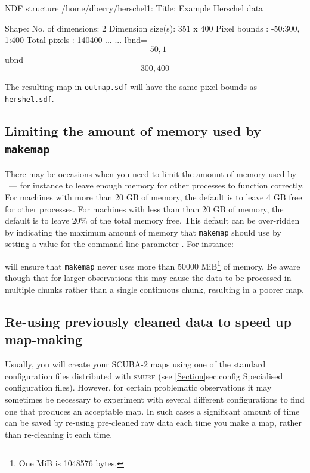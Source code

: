 \begin{terminalv}
\begin{terminalv}

   NDF structure /home/dberry/herschel1:
      Title:  Example Herschel data

   Shape:
      No. of dimensions:  2
      Dimension size(s):  351 x 400
      Pixel bounds     :  -50:300, 1:400
      Total pixels     :  140400
...
...
          lbnd=\[-50,1\] ubnd=\[300,400\]
\end{terminalv}

The resulting map in \texttt{outmap.sdf} will have the same pixel bounds
as \texttt{hershel.sdf}.

\subsection{Limiting the amount of memory used by \texttt{makemap}}
There may be occasions when you need to limit the amount of memory used
by \makemap\ --- for instance to leave enough memory for other processes
to function correctly. For machines with more than 20 GB of memory, the
default is to leave 4 GB free for other processes. For machines with less
than than 20 GB of memory, the default is to leave 20\% of the total
memory free. This default can be over-ridden by indicating the maximum
amount of memory that \texttt{makemap} should use by setting a value for
the command-line parameter . For instance:

\begin{terminalv}
\end{terminalv}

will ensure that \texttt{makemap} never uses more than 50000
MiB\footnote{One MiB is 1048576 bytes.} of memory. Be aware though that
for larger observations this may cause the data to be processed in
multiple chunks rather than a single continuous chunk, resulting in a
poorer map.

\subsection{Re-using previously cleaned data to speed up map-making}
\label{sec:reuse}

Usually, you will create your SCUBA-2 maps using one of the standard
configuration files distributed with \textsc{smurf} (see
\cref{Section}{sec:config} {Specialised configuration files}). However,
for certain problematic observations it may sometimes be necessary to
experiment with several different configurations to find one that
produces an acceptable map. In such cases a significant amount of time
can be saved by re-using pre-cleaned raw data each time you make a map,
rather than re-cleaning it each time.


\end{terminalv}
